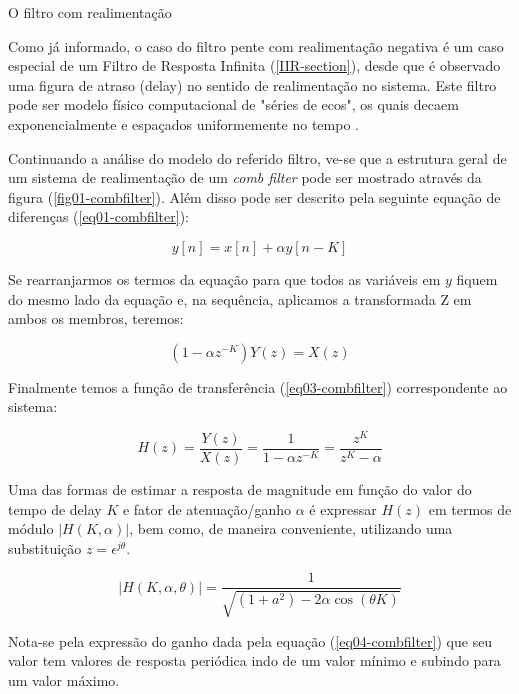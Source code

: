 		O filtro com realimentação 
		
		Como já informado, o caso do filtro pente com realimentação negativa é um caso especial de um Filtro de Resposta Infinita (\ref{IIR-section}), desde que é observado uma figura de atraso (delay) no sentido de realimentação no sistema. Este filtro pode ser modelo físico computacional de "séries de ecos", os quais decaem exponencialmente e espaçados uniformemente no tempo \cite{JULIUSO.SMITH2010}.
		
		
		Continuando a análise do modelo do referido filtro, ve-se que a estrutura geral de um sistema de realimentação de um \textit{comb filter} pode ser mostrado através da figura (\ref{fig01-combfilter}). Além disso pode ser descrito pela seguinte equação de diferenças (\ref{eq01-combfilter}):
				
		\begin{equation}
			\label{eq01-combfilter}
			y[n] = x[n] + \alpha y[n-K]
		\end{equation}
		
		Se rearranjarmos os termos da equação para que todos as variáveis em $y$ fiquem do mesmo lado da equação e, na sequência, aplicamos a transformada Z em ambos os membros, teremos:
		
		\begin{equation}
			\label{eq02-combfilter}
			(1-\alpha z^{-K})Y(z) = X(z)
		\end{equation}
		
		Finalmente temos a função de transferência (\ref{eq03-combfilter}) correspondente ao sistema:
		
		\begin{equation}
			\label{eq03-combfilter}
			H(z) = \frac{Y(z)}{X(z)} = \frac{1}{1-\alpha z^{-K}} = \frac{z^K}{z^K-\alpha}
		\end{equation}
		
		Uma das formas de estimar a resposta de magnitude em função do valor do tempo de delay $K$ e fator de atenuação/ganho $\alpha$ é expressar $ H(z) $ em termos de módulo $|H(K,\alpha)|$, bem como, de maneira conveniente, utilizando uma substituição $ z = \epsilon^{j\theta} $.
		
		\begin{equation}
			|H(K,\alpha,\theta)| = \frac{1}{\sqrt{(1+a^2) - 2\alpha \cos(\theta K)}}
			\label{eq04-combfilter}
		\end{equation}
		
		Nota-se pela expressão do ganho dada pela equação (\ref{eq04-combfilter}) que seu valor tem valores de resposta periódica indo de um valor mínimo e subindo para um valor máximo.
		
